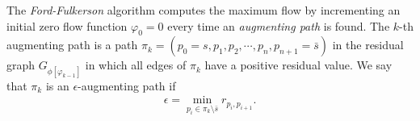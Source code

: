 The \emph{Ford-Fulkerson} algorithm computes the maximum flow by incrementing an initial zero flow function $\varphi_0=0$ every time an \emph{augmenting path} is found. The $k$-th augmenting path is a path $\pi_k = (p_0=s,p_1,p_2,\cdots,p_n,p_{n+1}=\bar{s})$ in the residual graph $G_{ \phi [\varphi_{k-1}] }$ in which all edges of $\pi_k$ have a positive residual value. We say that $\pi_k$ is an $\epsilon$-augmenting path if 
\begin{align*}
	\epsilon = \min_{p_i \in \pi_k\setminus {\bar{s}}} r_{p_i,p_{i+1}}.
\end{align*}
%
\begin{figure}
\center
{}\\
\end{figure}
